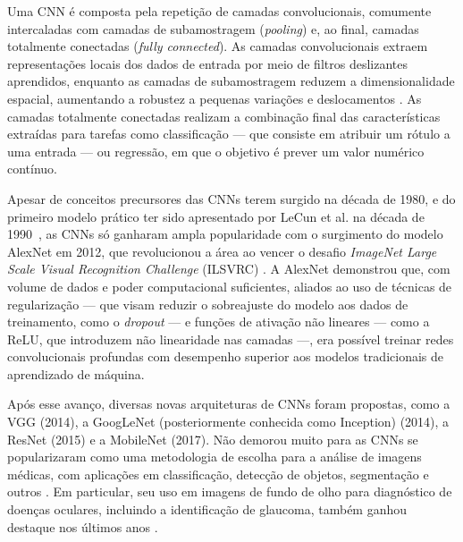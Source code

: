 \documentclass[12pt]{article}
\begin{document}
Uma CNN é composta pela repetição de camadas convolucionais, comumente intercaladas com camadas de subamostragem (\emph{pooling}) e, ao final, camadas totalmente conectadas (\emph{fully connected}). As camadas convolucionais extraem representações locais dos dados de entrada por meio de filtros deslizantes aprendidos, enquanto as camadas de subamostragem reduzem a dimensionalidade espacial, aumentando a robustez a pequenas variações e deslocamentos \cite{goodfellow2016}. As camadas totalmente conectadas realizam a combinação final das características extraídas para tarefas como classificação --- que consiste em atribuir um rótulo a uma entrada --- ou regressão, em que o objetivo é prever um valor numérico contínuo.

Apesar de conceitos precursores das CNNs terem surgido na década de 1980, e do primeiro modelo prático ter sido apresentado por LeCun et al. na década de 1990~\cite{lecun1998gradient}, as CNNs só ganharam ampla popularidade com o surgimento do modelo AlexNet em 2012, que revolucionou a área ao vencer o desafio \emph{ImageNet Large Scale Visual Recognition Challenge} (ILSVRC) \cite{krizhevsky2012imagenet}.
A AlexNet demonstrou que, com volume de dados e poder computacional suficientes, aliados ao uso de técnicas de regularização --- que visam reduzir o sobreajuste do modelo aos dados de treinamento, como o \emph{dropout} --- e funções de ativação não lineares --- como a ReLU, que introduzem não linearidade nas camadas ---, era possível treinar redes convolucionais profundas com desempenho superior aos modelos tradicionais de aprendizado de máquina.

Após esse avanço, diversas novas arquiteturas de CNNs foram propostas, como a VGG \cite{simonyan2015very} (2014), a GoogLeNet (posteriormente conhecida como Inception) \cite{szegedy2015going} (2014), a ResNet \cite{he2016deep} (2015) e a MobileNet \cite{howard2017mobilenet} (2017). Não demorou muito para as CNNs se popularizaram como uma metodologia de escolha para a análise de imagens médicas, com aplicações em classificação, detecção de objetos, segmentação e outros \cite{litjens_2017}. Em particular, seu uso em imagens de fundo de olho para diagnóstico de doenças oculares, incluindo a identificação de glaucoma, também ganhou destaque nos últimos anos \cite{li_review_2021}.
\end{document}
